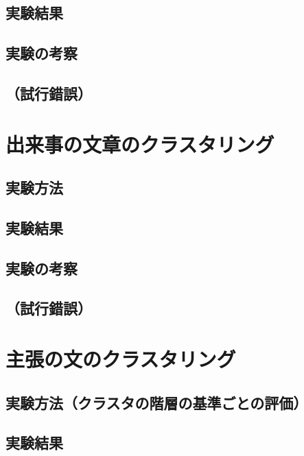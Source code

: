 \documentclass[12pt,a4j]{jreport}
\begin{document}
\subsection{実験結果}


\subsection{実験の考察}


\subsection{（試行錯誤）}


\section{出来事の文章のクラスタリング}


\subsection{実験方法}


\subsection{実験結果}


\subsection{実験の考察}


\subsection{（試行錯誤）}


\section{主張の文のクラスタリング}


\subsection{実験方法（クラスタの階層の基準ごとの評価）}


\subsection{実験結果}
\end{document}
